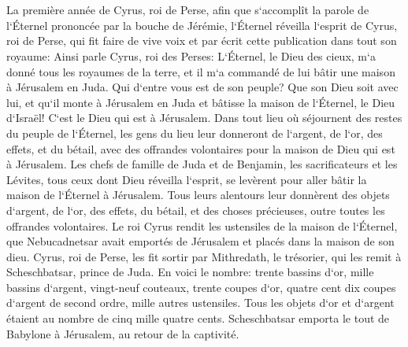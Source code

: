 

\chapter{}

\verse La première année de Cyrus, roi de Perse, afin que s`accomplît la parole de l`Éternel prononcée par la bouche de Jérémie, l`Éternel réveilla l`esprit de Cyrus, roi de Perse, qui fit faire de vive voix et par écrit cette publication dans tout son royaume: 
\verse Ainsi parle Cyrus, roi des Perses: L`Éternel, le Dieu des cieux, m`a donné tous les royaumes de la terre, et il m`a commandé de lui bâtir une maison à Jérusalem en Juda. 
\verse Qui d`entre vous est de son peuple? Que son Dieu soit avec lui, et qu`il monte à Jérusalem en Juda et bâtisse la maison de l`Éternel, le Dieu d`Israël! C`est le Dieu qui est à Jérusalem. 
\verse Dans tout lieu où séjournent des restes du peuple de l`Éternel, les gens du lieu leur donneront de l`argent, de l`or, des effets, et du bétail, avec des offrandes volontaires pour la maison de Dieu qui est à Jérusalem. 
\verse Les chefs de famille de Juda et de Benjamin, les sacrificateurs et les Lévites, tous ceux dont Dieu réveilla l`esprit, se levèrent pour aller bâtir la maison de l`Éternel à Jérusalem. 
\verse Tous leurs alentours leur donnèrent des objets d`argent, de l`or, des effets, du bétail, et des choses précieuses, outre toutes les offrandes volontaires. 
\verse Le roi Cyrus rendit les ustensiles de la maison de l`Éternel, que Nebucadnetsar avait emportés de Jérusalem et placés dans la maison de son dieu. 
\verse Cyrus, roi de Perse, les fit sortir par Mithredath, le trésorier, qui les remit à Scheschbatsar, prince de Juda. 
\verse En voici le nombre: trente bassins d`or, mille bassins d`argent, vingt-neuf couteaux, 
\verse trente coupes d`or, quatre cent dix coupes d`argent de second ordre, mille autres ustensiles. 
\verse Tous les objets d`or et d`argent étaient au nombre de cinq mille quatre cents. Scheschbatsar emporta le tout de Babylone à Jérusalem, au retour de la captivité. 

\chapter{}


